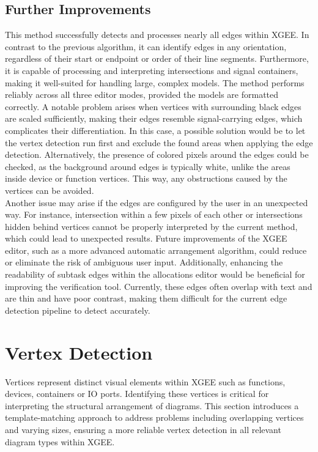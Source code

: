 \subsection{Further Improvements}
This method successfully detects and processes nearly all edges within XGEE. In contrast to the previous algorithm, it can identify edges in any orientation, regardless of their start or endpoint or order of their line segments. Furthermore, it is capable of processing and interpreting intersections and signal containers, making it well-suited for handling large, complex models. The method performs reliably across all three editor modes, provided the models are formatted correctly.
A notable problem arises when vertices with surrounding black edges are scaled sufficiently, making their edges resemble signal-carrying edges, which complicates their differentiation. In this case, a possible solution would be to let the vertex detection run first and exclude the found areas when applying the edge detection. Alternatively, the presence of colored pixels around the edges could be checked, as the background around edges is typically white, unlike the areas inside device or function vertices. This way, any obstructions caused by the vertices can be avoided.\\
Another issue may arise if the edges are configured by the user in an unexpected way. For instance, intersection within a few pixels of each other or intersections hidden behind vertices cannot be properly interpreted by the current method, which could lead to unexpected results. Future improvements of the XGEE editor, such as a more advanced automatic arrangement algorithm, could reduce or eliminate the risk of ambiguous user input. Additionally, enhancing the readability of subtask edges within the allocations editor would be beneficial for improving the verification tool. Currently, these edges often overlap with text and are thin and have poor contrast, making them difficult for the current edge detection pipeline to detect accurately.

\section{Vertex Detection}
\label{chp_vertex_detection}
Vertices represent distinct visual elements within XGEE such as functions, devices, containers or IO ports. Identifying these vertices is critical for interpreting the structural arrangement of diagrams. This section introduces a template-matching approach to address problems including overlapping vertices and varying sizes, ensuring a more reliable vertex detection in all relevant diagram types within XGEE.

